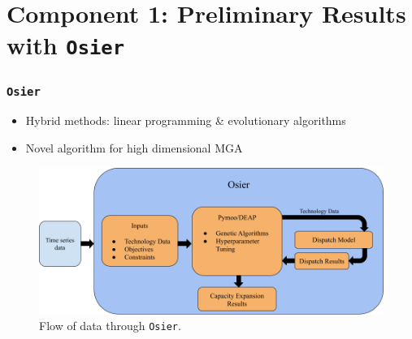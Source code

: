 

\section{Component 1: Preliminary Results with \texttt{Osier}}
\begin{frame}
    \frametitle{\texttt{Osier}}
    \begin{itemize}
        \item Hybrid methods: linear programming \& evolutionary algorithms
        \item Novel algorithm for high dimensional MGA
    \end{itemize}
    \begin{figure}
        \centering
        \includegraphics[width=\columnwidth]{../docs/figures/osier_flow.png}
        \caption{Flow of data through \texttt{Osier}.}
        \label{fig:osier-flow}
    \end{figure}

\end{frame}

